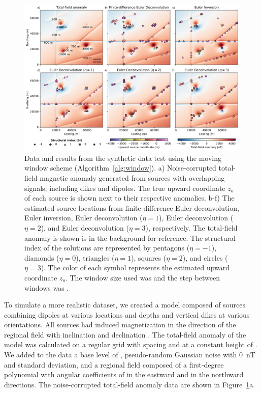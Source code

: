 \begin{figure}[tb!]
\centering
\includegraphics[width=1\linewidth]{figures/synthetic-windows.png}
\caption{
    Data and results from the synthetic data test using the moving window scheme (Algorithm~\ref{alg:window}).
    a) Noise-corrupted total-field magnetic anomaly generated from \SynWinNSources{} sources with overlapping signals, including dikes and dipoles. The true upward coordinate $z_o$ of each source is shown next to their respective anomalies.
    b-f) The estimated source locations from finite-difference Euler deconvolution, Euler inversion, Euler deconvolution ($\eta=1$), Euler deconvolution ($\eta=2$), and Euler deconvolution ($\eta=3$), respectively. The total-field anomaly is shown is in the background for reference.
    The structural index of the solutions are represented by pentagons ($\eta=-1$),  diamonds ($\eta=0$),  triangles ($\eta=1$),  squares ($\eta=2$), and circles ($\eta=3$).
    The color of each symbol represents the estimated upward coordinate $z_o$.
    The window size used was \SynWinWindowSize{} and the step between windows was \SynWinWindowStep{}.
}
\label{fig:windows}
\end{figure}

To simulate a more realistic dataset, we created a model composed of \SynWinNSources{} sources combining dipoles at various locations and depths and vertical dikes at various orientations.
All sources had induced magnetization in the direction of the regional field with inclination \SynWinInc{} and declination \SynWinDec{}.
The total-field anomaly of the model was calculated on a regular grid with spacing \SynWinSpacing{} and at a constant height of \SynWinHeight{}.
We added to the data a base level of \SynWinBase{}, pseudo-random Gaussian noise with \qty{0}{\nano\tesla} and \SynWinNoise{} standard deviation, and a regional field composed of a first-degree polynomial with angular coefficients of \SynWinRegionalE{} in the eastward and \SynWinRegionalN{} in the northward directions.
The noise-corrupted total-field anomaly data are shown in Figure~\ref{fig:windows}a.

